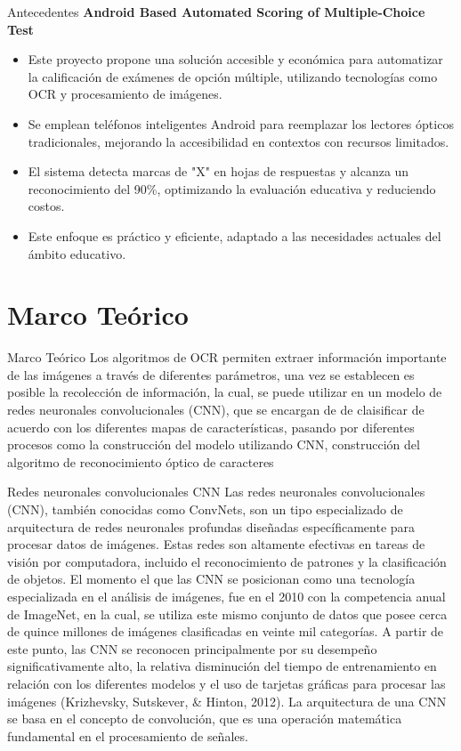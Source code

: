 \documentclass{beamer}
\begin{document}
\begin{frame}{Antecedentes}
    \textbf{Android Based Automated Scoring of Multiple-Choice Test}
    \begin{itemize}
        \item Este proyecto propone una solución accesible y económica para automatizar la calificación de exámenes de opción múltiple, utilizando tecnologías como OCR y procesamiento de imágenes.
        \item Se emplean teléfonos inteligentes Android para reemplazar los lectores ópticos tradicionales, mejorando la accesibilidad en contextos con recursos limitados.
        \item El sistema detecta marcas de "X" en hojas de respuestas y alcanza un reconocimiento del 90\%, optimizando la evaluación educativa y reduciendo costos.
        \item Este enfoque es práctico y eficiente, adaptado a las necesidades actuales del ámbito educativo.
    \end{itemize}
\end{frame}

\section{Marco Teórico}
\begin{frame}{Marco Teórico}
    Los algoritmos de OCR permiten extraer información importante de las imágenes a través de diferentes parámetros, una vez se establecen es posible la recolección de información, la cual, se puede utilizar en un modelo de redes neuronales convolucionales (CNN), que se encargan de de claisificar de acuerdo con los diferentes mapas de características,
    pasando por diferentes procesos como la construcción del modelo utilizando CNN, construcción del algoritmo de reconocimiento óptico de caracteres
\end{frame}


\begin{frame}{Redes neuronales convolucionales CNN}
    Las redes neuronales convolucionales (CNN), también conocidas como ConvNets, son un tipo especializado de arquitectura de redes neuronales profundas diseñadas específicamente para procesar datos de imágenes. Estas redes son altamente efectivas en tareas de visión por computadora, incluido el reconocimiento de patrones y la clasificación de objetos. El momento el que las CNN se posicionan como una tecnología especializada en el análisis de imágenes, fue en el 2010 con la competencia anual de ImageNet, en la cual, se utiliza este mismo conjunto de datos que posee cerca de quince millones de imágenes clasificadas en veinte mil categorías. A partir de este punto, las CNN se reconocen principalmente por su desempeño significativamente alto, la relativa disminución del tiempo de entrenamiento en relación con los diferentes modelos y el uso de tarjetas gráficas para procesar las imágenes (Krizhevsky, Sutskever, \& Hinton, 2012). La arquitectura de una CNN se basa en el concepto de convolución, que es una operación matemática fundamental en el procesamiento de señales.
\end{frame}
\end{document}
